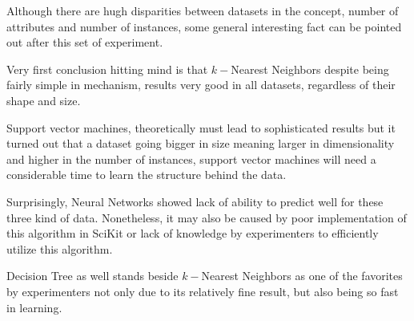 Although there are hugh disparities between datasets in the concept, number of
attributes and number of instances, some general interesting fact can be pointed
out after this set of experiment.

Very first conclusion hitting mind is that $k-$Nearest Neighbors despite being
fairly simple in mechanism, results very good in all datasets, regardless of
their shape and size.

Support vector machines, theoretically must lead to sophisticated results but it
turned out that a dataset going bigger in size meaning larger in dimensionality
and higher in the number of instances, support vector machines will need a
considerable time to learn the structure behind the data.

Surprisingly, Neural Networks showed lack of ability to predict well for these
three kind of data. Nonetheless, it may also be caused by poor implementation of
this algorithm in SciKit or lack of knowledge by experimenters to efficiently
utilize this algorithm.

Decision Tree as well stands beside $k-$Nearest Neighbors as one of the
favorites by experimenters not only due to its relatively fine result, but also
being so fast in learning.


